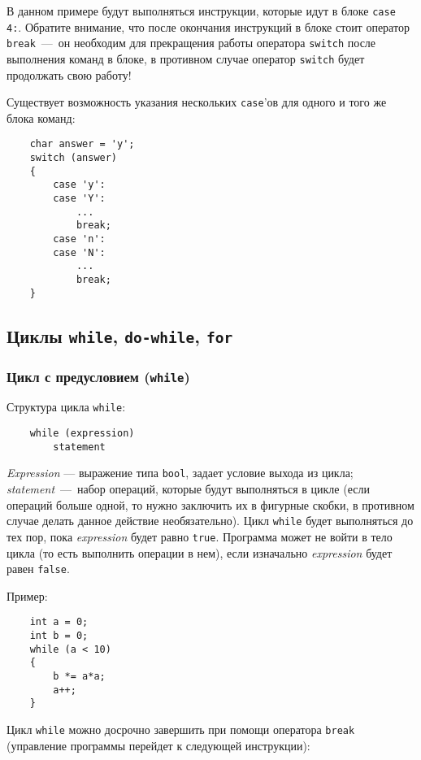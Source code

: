 В данном примере будут выполняться инструкции, которые идут в блоке \lstinline|case 4:|. Обратите внимание, что после окончания инструкций в блоке стоит оператор \lstinline|break|~---~он необходим для прекращения работы оператора \lstinline|switch| после выполнения команд в блоке, в противном случае оператор \lstinline|switch| будет продолжать свою работу!

Существует возможность указания нескольких \lstinline|case|'ов для одного и того же блока команд:

\begin{lstlisting}
    char answer = 'y';
    switch (answer)
    {
        case 'y':
        case 'Y':
            ...
            break;
        case 'n':
        case 'N':
            ...
            break;
    }
\end{lstlisting}

\subsection{Циклы \texttt{while}, \texttt{do-while}, \texttt{for}}
\subsubsection{Цикл с предусловием (\texttt{while})}
Структура цикла \lstinline|while|:
\begin{lstlisting}
    while (expression)
        statement
\end{lstlisting}

\textit{Expression} --- выражение типа \lstinline|bool|, задает условие выхода из цикла; \textit{statement}~---~набор операций, которые будут выполняться в цикле (если операций больше одной, то нужно заключить их в фигурные скобки, в противном случае делать данное действие необязательно). Цикл \lstinline|while| будет выполняться до тех пор, пока \textit{expression} будет равно \lstinline|true|. Программа может не войти в тело цикла (то есть выполнить операции в нем), если изначально \textit{expression} будет равен \lstinline|false|.

Пример:

\begin{lstlisting}
    int a = 0;
    int b = 0;
    while (a < 10)
    {
        b *= a*a;
        a++;
    }
\end{lstlisting}

Цикл \lstinline|while| можно досрочно завершить при помощи оператора \lstinline|break| (управление программы перейдет к следующей инструкции):

